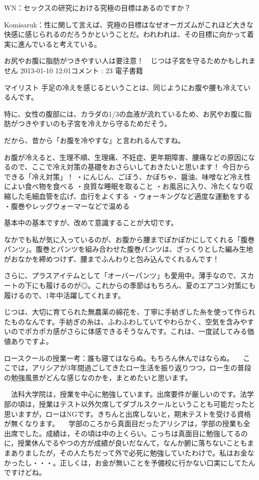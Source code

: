 WN：セックスの研究における究極の目標はあるのですか？

Komisaruk：性に関して言えば、究極の目標はなぜオーガズムがこれほど大きな快感に感じられるのだろうかということだ。われわれは、その目標に向かって着実に進んでいると考えている。




お尻やお腹に脂肪がつきやすい人は要注意！　じつは子宮を守るためかもしれません
2013-01-10 12:01コメント : 23 
電子書籍
    
マイリスト  
手足の冷えを感じるということは、同じようにお腹や腰も冷えているんです。

特に、女性の腹部には、カラダの1/3の血液が流れているため、お尻やお腹に脂肪がつきやすいのも子宮を冷えから守るためだそう。

だから、昔から「お腹を冷やすな」と言われるんですね。

お腹が冷えると、生理不順、生理痛、不妊症、更年期障害、腰痛などの原因になるので、ここで冷え対策の基礎をおさらいしておきたいと思います！
今日からできる「冷え対策」！
・にんじん、ごぼう、かぼちゃ、醤油、味噌など冷え性によい食べ物を食べる
・良質な睡眠を取ること
・お風呂に入り、冷たくなり収縮した毛細血管を広げ、血行をよくする
・ウォーキングなど適度な運動をする
・腹巻やレッグウォーマーなどで温める

基本中の基本ですが、改めて意識することが大切です。

なかでも私が気に入っているのが、お腹から腰までぽかぽかにしてくれる「腹巻パンツ」。腹巻とパンツを組み合わせた腹巻パンツは、ざっくりとした編み生地がおなかを締めつけず、腰までふんわりと包み込んでくれるんです！

さらに、プラスアイテムとして「オーバーパンツ」も愛用中。薄手なので、スカートの下にも履けるのが◎。これからの季節はもちろん、夏のエアコン対策にも履けるので、1年中活躍してくれます。

じつは、大切に育てられた無農薬の綿花を、丁寧に手紡ぎした糸を使って作られたものなんです。手紡ぎの糸は、ふわふわしていてやわらかく、空気を含みやすいのでポカポカ感がさらに体感できるそうなんです。これは、一度試してみる価値ありですよ。




ロースクールの授業一考：誰も寝てはならぬ。もちろん休んではならぬ。
　ここでは，アリシアが3年間過ごしてきたロー生活を振り返りつつ，ロー生の普段の勉強風景がどんな感じなのかを，まとめたいと思います。

　法科大学院は，授業を中心に勉強しています。出席要件が厳しいのです。法学部の頃は，授業はテスト以外欠席してダブルスクールということも可能だったと思いますが，ローはNGです。きちんと出席しないと，期末テストを受ける資格が無くなります。
　学部のころから真面目だったアリシアは，学部の授業も全出席でした。成績は，その頃は中の上くらい。こっちは真面目に勉強してるのに，授業休んでるやつの方が成績が良いだなんて，なんか腑に落ちないこともままありましたが，その人たちだって外で必死に勉強していたわけで。私はお金なかったし・・・。正しくは，お金が無いことを予備校に行かない口実にしてたんですけどね。

